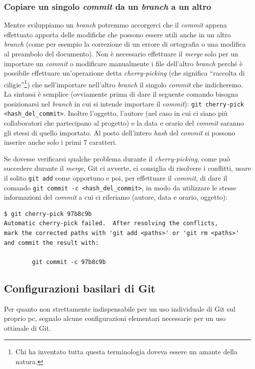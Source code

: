 \documentclass[a4paper,12pt,oneside]{article}
\begin{document}
\subsubsection{Copiare un singolo \emph{commit} da un \emph{branch} a un altro}
Mentre sviluppiamo un \emph{branch} potremmo accorgerci che il \emph{commit} appena
effettuato apporta delle modifiche che possono essere utili anche in un altro
\emph{branch} (come per esempio la correzione di un errore di ortografia o una
modifica al preambolo del documento). Non è necessario effettuare il \emph{merge}
solo per un importare un \emph{commit} o modificare manualmente i file dell'altro
\emph{branch} perché è possibile effettuare un'operazione detta
\emph{cherry-picking} (che significa ``raccolta di ciligie''\footnote{Chi ha
  inventato tutta questa terminologia doveva essere un amante della natura.}) che
nell'importare nell'altro \emph{branch} il singolo \emph{commit} che
indicheremo. La sintassi è semplice (ovviamente prima di dare il seguente comando
bisogna posizionarsi nel \emph{branch} in cui si intende importare il \emph{commit}):
\lstinline|git cherry-pick <hash_del_commit>|. Inoltre l'oggetto, l'autore (nel
caso in cui ci siano più collaboratori che partecipano al progetto) e la data e
orario del \emph{commit} saranno gli stessi di quello importato. Al posto
dell'intero \emph{hash} del \emph{commit} si possono inserire anche solo i primi
$7$ caratteri.

Se dovesse verificarsi qualche problema durante il \emph{cherry-picking}, come
può succedere durante il \emph{merge}, Git ci avverte, ci consiglia di risolvere
i conflitti, usare il solito \lstinline|git add| come opportuno e poi, per
effettuare il \emph{commit}, di dare il comando
\lstinline|git commit -c <hash_del_commit>|, in modo da utilizzare le stesse
informazioni del \emph{commit} a cui ci riferiamo (autore, data e orario,
oggetto):
\begin{lstlisting}[language={},emph=git]
$ git cherry-pick 97b8c9b
Automatic cherry-pick failed.  After resolving the conflicts,
mark the corrected paths with 'git add <paths>' or 'git rm <paths>'
and commit the result with: 

        git commit -c 97b8c9b
\end{lstlisting}

\subsection{Configurazioni basilari di Git}
Per quanto non strettamente indispensabile per un uso individuale di Git sul
proprio pc, segnalo alcune configurazioni elementari necessarie per un uso
ottimale di Git.
\end{document}

